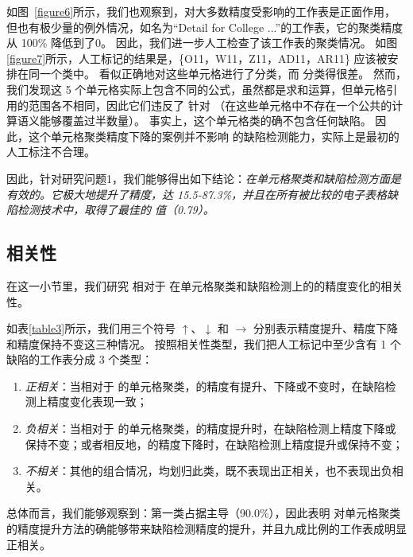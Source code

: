 如图~\ref{figure6}所示，我们也观察到，\wa 对大多数精度受影响的工作表是正面作用，但也有极少量的例外情况，如名为“Detail for College ...”的工作表，它的聚类精度从 100\% 降低到了0。
因此，我们进一步人工检查了该工作表的聚类情况。
如图\ref{figure7}所示，人工标记的结果是，\{O11，W11，Z11，AD11，AR11\} 应该被安排在同一个类中。
\cu 看似正确地对这些单元格进行了分类，而 \wa 分类得很差。
然而，我们发现这 5 个单元格实际上包含不同的公式，虽然都是求和运算，但单元格引用的范围各不相同，因此它们违反了 \wa 针对 \wcvp （在这些单元格中不存在一个公共的计算语义能够覆盖过半数量）。
事实上，这个单元格类的确不包含任何缺陷。
因此，这个单元格聚类精度下降的案例并不影响 \wa 的缺陷检测能力，实际上是最初的人工标注不合理。

因此，针对研究问题1，我们能够得出如下结论：\textit{\wa 在单元格聚类和缺陷检测方面是有效的。它极大地提升了精度，达 15.5-87.3\%，并且在所有被比较的电子表格缺陷检测技术中，取得了最佳的 \fmd 值（0.79）。}

\subsection{相关性}

在这一小节里，我们研究 \wa 相对于 \cu 在单元格聚类和缺陷检测上的的精度变化的相关性。

如表\ref{table3}所示，我们用三个符号 $\uparrow$、$\downarrow$ 和 $\to$ 分别表示精度提升、精度下降和精度保持不变这三种情况。
按照相关性类型，我们把人工标记中至少含有 1 个缺陷的工作表分成 3 个类型：
\begin{enumerate}
    \item \textit{正相关}：当相对于 \cu 的单元格聚类，\wa 的精度有提升、下降或不变时，在缺陷检测上精度变化表现一致；
    \item \textit{负相关}：当相对于 \cu 的单元格聚类，\wa 的精度提升时，在缺陷检测上精度下降或保持不变；或者相反地，\wa 的精度下降时，在缺陷检测上精度提升或保持不变；
    \item \textit{不相关}：其他的组合情况，均划归此类，既不表现出正相关，也不表现出负相关。
\end{enumerate}

总体而言，我们能够观察到：第一类占据主导（90.0\%），因此表明 \wa 对单元格聚类的精度提升方法的确能够带来缺陷检测精度的提升，并且九成比例的工作表成明显正相关。



